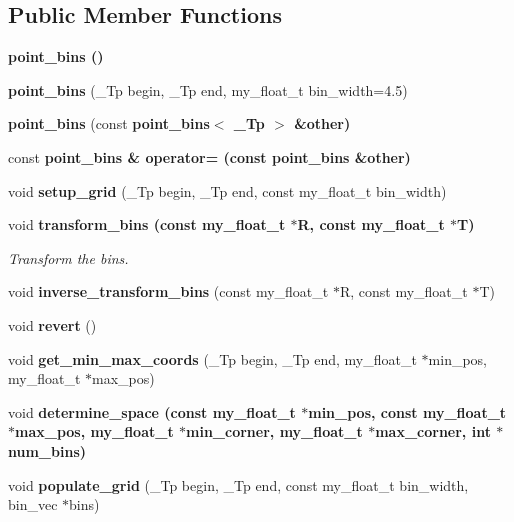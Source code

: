 \subsection*{Public Member Functions}
\begin{CompactItemize}
\item 
\bf{point\_\-bins} ()
\item 
\textbf{point\_\-bins} (\_\-Tp begin, \_\-Tp end, my\_\-float\_\-t bin\_\-width=4.5)\label{classSimSite3D_1_1point__bins_612dc97af37ea4512699f0fc0d47c61a}

\item 
\textbf{point\_\-bins} (const \bf{point\_\-bins}$<$ \_\-Tp $>$ \&other)\label{classSimSite3D_1_1point__bins_d2ed01481c90b33ff07f0668e039e89f}

\item 
const \bf{point\_\-bins} \& \textbf{operator=} (const \bf{point\_\-bins} \&other)\label{classSimSite3D_1_1point__bins_ec766713f1c00b6cca41d52940f91050}

\item 
void \textbf{setup\_\-grid} (\_\-Tp begin, \_\-Tp end, const my\_\-float\_\-t bin\_\-width)\label{classSimSite3D_1_1point__bins_8a32f681bd20aa78a9b1cd3c0773be1e}

\item 
void \bf{transform\_\-bins} (const my\_\-float\_\-t $\ast$R, const my\_\-float\_\-t $\ast$T)
\begin{CompactList}\small\item\em Transform the bins. \item\end{CompactList}\item 
void \textbf{inverse\_\-transform\_\-bins} (const my\_\-float\_\-t $\ast$R, const my\_\-float\_\-t $\ast$T)\label{classSimSite3D_1_1point__bins_ecf57c0678d1fec450842dfef3b81a97}

\item 
void \textbf{revert} ()\label{classSimSite3D_1_1point__bins_a68b236a6dcfb2a1d344ae6b2cf3a7e3}

\item 
void \textbf{get\_\-min\_\-max\_\-coords} (\_\-Tp begin, \_\-Tp end, my\_\-float\_\-t $\ast$min\_\-pos, my\_\-float\_\-t $\ast$max\_\-pos)\label{classSimSite3D_1_1point__bins_00ff5e0a19964585b8e01189e0ca0f82}

\item 
void \bf{determine\_\-space} (const my\_\-float\_\-t $\ast$min\_\-pos, const my\_\-float\_\-t $\ast$max\_\-pos, my\_\-float\_\-t $\ast$min\_\-corner, my\_\-float\_\-t $\ast$max\_\-corner, int $\ast$num\_\-bins)
\item 
void \textbf{populate\_\-grid} (\_\-Tp begin, \_\-Tp end, const my\_\-float\_\-t bin\_\-width, bin\_\-vec $\ast$bins)\label{classSimSite3D_1_1point__bins_6535d13b3b00438158656471f67a44c6}


\end{CompactItemize}
